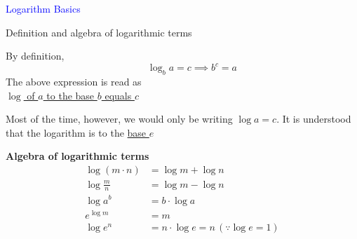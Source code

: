 \documentclass[14pt,fleqn]{extarticle}
\begin{document}
\begin{skill}
\begin{narrow}
\textcolor{blue}{Logarithm Basics}

Definition and algebra of logarithmic terms 
\end{narrow}

\reason 

By definition, \[ \qquad \log_b a = c \implies b^c = a \]
The above expression is read as \\
\underline{$\log$ of $a$ to the base $b$ equals $c$}\newline 

Most of the time, however, we would
only be writing $\log a = c$. It is understood that the logarithm 
is to the \underline{base $e$}\newline 

\textbf{Algebra of logarithmic terms}
\begin{align}
\log (m\cdot n) &= \log m + \log n \\
\log \frac{m}{n} &= \log m - \log n \\ 
\log a^b &= b\cdot \log a \\ 
e^{\log m} &= m \\
\log e^{n} &= n\cdot\log e = n\,(\because \log e = 1)
\end{align}
\end{skill}
\end{document}
